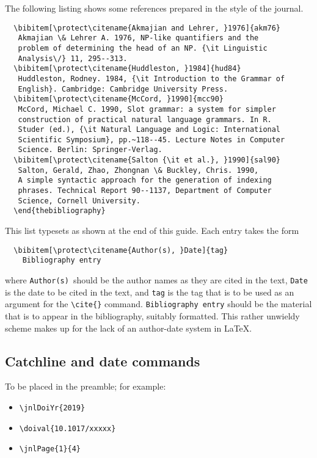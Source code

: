 \documentclass{pas}
\begin{document}
The following listing shows some references prepared in the style of the
journal.
%
{\fontsize{7}{9}\selectfont
\begin{verbatim}
  \bibitem[\protect\citename{Akmajian and Lehrer, }1976]{akm76}
   Akmajian \& Lehrer A. 1976, NP-like quantifiers and the
   problem of determining the head of an NP. {\it Linguistic
   Analysis\/} 11, 295--313.
  \bibitem[\protect\citename{Huddleston, }1984]{hud84}
   Huddleston, Rodney. 1984, {\it Introduction to the Grammar of
   English}. Cambridge: Cambridge University Press.
  \bibitem[\protect\citename{McCord, }1990]{mcc90}
   McCord, Michael C. 1990, Slot grammar: a system for simpler
   construction of practical natural language grammars. In R.
   Studer (ed.), {\it Natural Language and Logic: International
   Scientific Symposium}, pp.~118--45. Lecture Notes in Computer
   Science. Berlin: Springer-Verlag.
  \bibitem[\protect\citename{Salton {\it et al.}, }1990]{sal90}
   Salton, Gerald, Zhao, Zhongnan \& Buckley, Chris. 1990,
   A simple syntactic approach for the generation of indexing
   phrases. Technical Report 90--1137, Department of Computer
   Science, Cornell University.
  \end{thebibliography}
\end{verbatim}}
%
This list typesets as shown at the end of this guide.
Each entry takes the form
%
\begin{verbatim}
  \bibitem[\protect\citename{Author(s), }Date]{tag}
    Bibliography entry
\end{verbatim}
%
where \verb"Author(s)"\ should be the author names as they are cited in
the text, \verb"Date" is the date to be cited in the text, and \verb"tag"
is the tag that is to be used as an argument for the \verb"\cite{}" command.
\verb"Bibliography entry" should be the
material that is to appear in the bibliography, suitably formatted.  This
rather unwieldy scheme makes up for the lack of an author-date system in
\LaTeX.

\subsection{Catchline and date commands}

To be placed in the preamble; for example:

\begin{itemize}
  \item \verb"\jnlDoiYr{2019}"
  \item \verb"\doival{10.1017/xxxxx}"
  \item \verb"\jnlPage{1}{4}"
\end{itemize}
\end{document}
